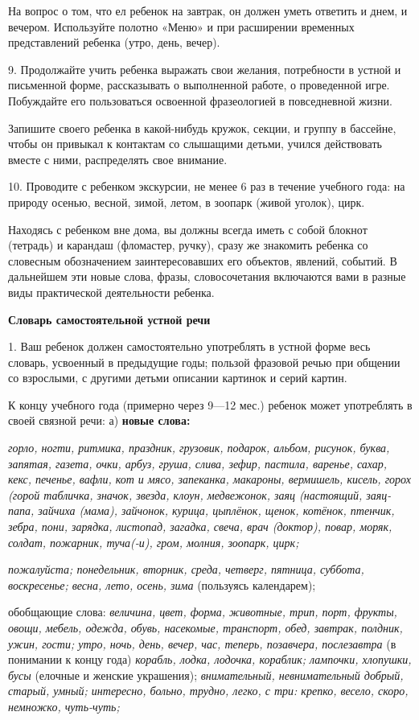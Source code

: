 \documentclass[a5paper]{book}
\renewcommand{\emph}[1]{\textit{#1}}
\begin{document}
На вопрос о том, что ел ребенок на завтрак, он должен уметь ответить и
днем, и вечером. Используйте полотно «Меню» и при расширении временных
представлений ребенка (утро, день, вечер).

9. Продолжайте учить ребенка выражать свои желания, потребности в устной
и письменной форме, рассказывать о выполненной работе, о проведенной
игре. Побуждайте его пользоваться освоенной фразеологией в повседневной
жизни.

Запишите своего ребенка в какой-нибудь кружок, секции, и группу в
бассейне, чтобы он привыкал к контактам со слышащими детьми, учился
действовать вместе с ними, распределять свое внимание.

10. Проводите с ребенком экскурсии, не менее 6 раз в течение учебного
года: на природу осенью, весной, зимой, летом, в зоопарк (живой уголок),
цирк.

Находясь с ребенком вне дома, вы должны всегда иметь с собой блокнот
(тетрадь) и карандаш (фломастер, ручку), сразу же знакомить ребенка со
словесным обозначением заинтересовавших его объектов, явлений, событий.
В дальнейшем эти новые слова, фразы, словосочетания включаются вами в
разные виды практической деятельности ребенка.

\textbf{Словарь самостоятельной устной речи}

1. Ваш ребенок должен самостоятельно употреблять в устной форме весь
словарь, усвоенный в предыдущие годы; пользой фразовой речью при общении
со взрослыми, с другими детьми описании картинок и серий картин.

К концу учебного года (примерно через 9---12 мес.) ребенок может
употреблять в своей связной речи: а) \textbf{новые слова:}

\emph{горло, ногти, ритмика, праздник, грузовик, подарок, альбом,
рисунок, буква, запятая, газета, очки, арбуз, груша, слива, зефир,
пастила, варенье, сахар, кекс, печенье, вафли, кот и мясо, запеканка,
макароны, вермишель, кисель, горох (горой табличка, значок, звезда,
клоун, медвежонок, заяц (настоящий, заяц-папа, зайчиха (мама), зайчонок,
курица, цыплёнок, щенок, котёнок, птенчик, зебра, пони, зарядка,
листопад, загадка, свеча, врач (доктор), повар, моряк, солдат, пожарник,
туча(-и), гром, молния, зоопарк, цирк;}

\emph{пожалуйста; понедельник, вторник, среда, четверг, пятница,
суббота, воскресенье; весна, лето, осень, зима} (пользуясь календарем);

обобщающие слова: \emph{величина, цвет, форма, животные, трип, порт,
фрукты, овощи, мебель, одежда, обувь, насекомые, транспорт, обед,
завтрак, полдник, ужин, гости; утро, ночь, день, вечер, час, теперь,
позавчера, послезавтра} (в понимании к концу года) \emph{корабль, лодка,
лодочка, кораблик; лампочки, хлопушки, бусы} (елочные и женские
украшения); \emph{внимательный, невнимательный добрый, старый, умный;
интересно, больно, трудно, легко, с три: крепко, весело, скоро,
немножко, чуть-чуть;}
\end{document}
